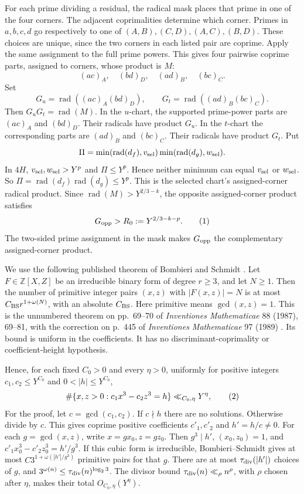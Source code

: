 For each prime dividing a residual, the radical mask places that prime in
one of the four corners.  The adjacent coprimalities determine which
corner.  Primes in \(a,b,c,d\) go respectively to one of
\((A,B),(C,D),(A,C),(B,D)\).  These choices are unique, since the two
corners in each listed pair are coprime.  Apply the same assignment to the
full prime powers.  This gives four pairwise coprime parts, assigned to
corners, whose product is \(M\):
\[
 (ac)_A,\quad (bd)_D,\quad (ad)_B,\quad (bc)_C.
\]
Set
\[
 G_u=\operatorname{rad}((ac)_A(bd)_D),\qquad
 G_t=\operatorname{rad}((ad)_B(bc)_C).
\]
Then \(G_uG_t=\operatorname{rad}(M)\).  In the \(u\)-chart, the supported
prime-power parts are \((ac)_A\) and \((bd)_D\).  Their radicals have
product \(G_u\).  In the \(t\)-chart the corresponding parts are
\((ad)_B\) and \((bc)_C\).  Their radicals have product \(G_t\).  Put
\[
 \Pi=\min(\operatorname{rad}(d_f),v_{\rm sel})
      \min(\operatorname{rad}(d_g),w_{\rm sel}).
\]
In \(4H\), \(v_{\rm sel},w_{\rm sel}>Y^p\) and \(\Pi\le Y^p\).  Hence
neither minimum can equal \(v_{\rm sel}\) or \(w_{\rm sel}\).  So
\(\Pi=\operatorname{rad}(d_f)\operatorname{rad}(d_g)\le Y^p\).  This is the
selected chart's assigned-corner radical product.  Since
\(\operatorname{rad}(M)>Y^{2/3-k}\), the opposite assigned-corner product
satisfies
\[
 G_{\rm opp}>R_0:=Y^{2/3-k-p}.                            \AutoTag{eq:old:6_9}
\]
The two-sided prime assignment in the mask makes \(G_{\rm opp}\) the
complementary assigned-corner product.

We use the following published theorem of Bombieri and Schmidt
\cite{BS1987}.  Let \(F\in\mathbb Z[X,Z]\) be an irreducible binary form
of degree \(r\ge3\), and let \(N\ge1\).  Then the number of primitive
integer pairs \((x,z)\) with \(|F(x,z)|=N\) is at most
\(C_{\rm BS} r^{1+\omega(N)}\), with an absolute \(C_{\rm BS}\).  Here
primitive means \(\gcd(x,z)=1\).  This is the unnumbered theorem on
pp.~69--70 of \emph{Inventiones Mathematicae} 88 (1987), 69--81, with the
correction on p.~445 of \emph{Inventiones Mathematicae} 97 (1989)
\cite{BS1989}. Its
bound is uniform in the coefficients.  It has no discriminant-coprimality
or coefficient-height hypothesis.

Hence, for each fixed \(C_0>0\) and every \(\eta>0\), uniformly for
positive integers \(c_1,c_2\le Y^{C_0}\) and
\(0<|h|\le Y^{C_0}\),
\[
 \#\{x,z>0:c_1x^3-c_2z^3=h\}\ll_{C_0,\eta}Y^\eta,
\AutoTag{eq:old:6_10}
\]
For the proof, let \(c=\gcd(c_1,c_2)\).  If \(c\nmid h\) there are no
solutions.  Otherwise divide by \(c\).  This gives coprime positive
coefficients \(c'_1,c'_2\) and \(h'=h/c\ne0\).  For each
\(g=\gcd(x,z)\), write \(x=gx_0,z=gz_0\).  Then \(g^3\mid h'\),
\((x_0,z_0)=1\), and
\(c'_1x_0^3-c'_2z_0^3=h'/g^3\).  If this cubic form is irreducible,
Bombieri--Schmidt gives at most
\(C3^{1+\omega(|h'|/g^3)}\) primitive pairs for that \(g\).  There are at
most \(\tau_{\mathrm{div}}(|h'|)\) choices of \(g\), and
\(3^{\omega(n)}\le\tau_{\mathrm{div}}(n)^{\log_2 3}\).  The divisor bound
\(\tau_{\mathrm{div}}(n)\ll_\rho n^\rho\), with \(\rho\) chosen after \(\eta\), makes
their total \(O_{C_0,\eta}(Y^\eta)\).

